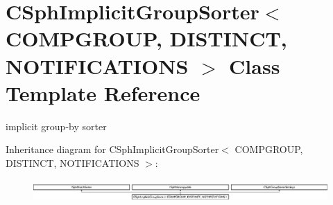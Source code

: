 \hypertarget{classCSphImplicitGroupSorter}{\section{C\-Sph\-Implicit\-Group\-Sorter$<$ C\-O\-M\-P\-G\-R\-O\-U\-P, D\-I\-S\-T\-I\-N\-C\-T, N\-O\-T\-I\-F\-I\-C\-A\-T\-I\-O\-N\-S $>$ Class Template Reference}
\label{classCSphImplicitGroupSorter}
}


implicit group-\/by sorter  


Inheritance diagram for C\-Sph\-Implicit\-Group\-Sorter$<$ C\-O\-M\-P\-G\-R\-O\-U\-P, D\-I\-S\-T\-I\-N\-C\-T, N\-O\-T\-I\-F\-I\-C\-A\-T\-I\-O\-N\-S $>$\-:\begin{figure}[H]
\begin{center}
\leavevmode
\includegraphics[height=0.864197cm]{classCSphImplicitGroupSorter}
\end{center}
\end{figure}
